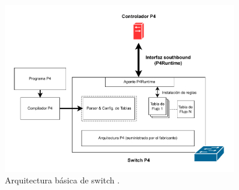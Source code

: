 \begin{figure}[ht!]
\centering
\includegraphics[width=0.9\textwidth]{fig/02_sota/sota_4_sdn_p4.drawio.pdf}
\caption{Arquitectura básica de switch .}
\label{fig:sdn_p4}
\end{figure}

